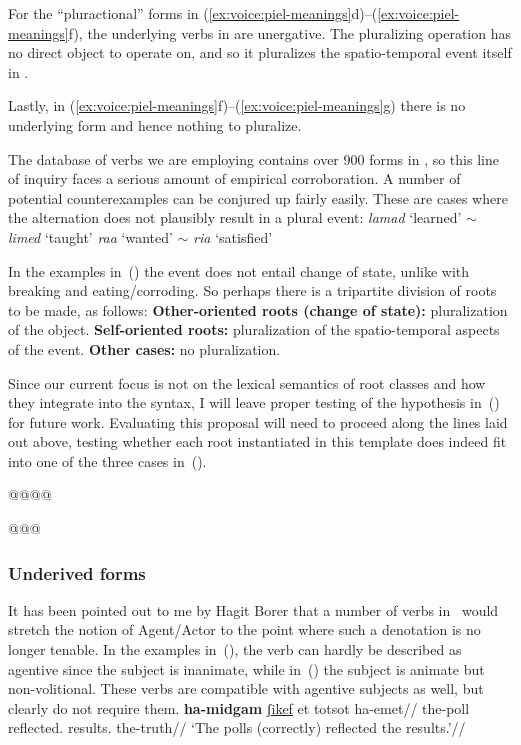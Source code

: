 For the ``pluractional'' forms in (\ref{ex:voice:piel-meanings}d)--(\ref{ex:voice:piel-meanings}f), the underlying verbs in {\tkal} are unergative. The pluralizing operation has no direct object to operate on, and so it pluralizes the spatio-temporal event itself in {\tpie}.

Lastly, in (\ref{ex:voice:piel-meanings}f)--(\ref{ex:voice:piel-meanings}g) there is no underlying form and hence nothing to pluralize.

The database of verbs we are employing contains over 900 forms in {\tpie}, so this line of inquiry faces a serious amount of empirical corroboration. A number of potential counterexamples can be conjured up fairly easily. These are cases where the alternation does not plausibly result in a plural event:
\pex
	\a \emph{lamad} `learned' $\sim$ \emph{limed} `taught'
	\a \emph{ra{\texttslig}a} `wanted' $\sim$ \emph{ri{\texttslig}a} `satisfied'
\xe

In the examples in~(\lastx) the event does not entail change of state, unlike with breaking and eating/corroding. So perhaps there is a tripartite division of roots to be made, as follows:
\pex
	\a \textbf{Other-oriented roots (change of state):} pluralization of the object.
	\a \textbf{Self-oriented roots:} pluralization of the spatio-temporal aspects of the event.
	\a \textbf{Other cases:} no pluralization.
\xe

Since our current focus is not on the lexical semantics of root classes and how they integrate into the syntax, I will leave proper testing of the hypothesis in~(\lastx) for future work. Evaluating this proposal will need to proceed along the lines laid out above, testing whether each root instantiated in this template does indeed fit into one of the three cases in~(\lastx).

@@\cite{greenberg10}@@


@@@
		\subsubsection{Underived forms} \label{voice:va:heb:underived}

It has been pointed out to me by Hagit Borer that a number of verbs in \tpie~would stretch the notion of Agent/Actor to the point where such a denotation is no longer tenable. In the examples in~(\nextx), the verb can hardly be described as agentive since the subject is inanimate, while in~(\anextx) the subject is animate but non-volitional. These verbs are compatible with agentive subjects as well, but clearly do not require them.
\pex
  \a \begingl
    \gla \textbf{ha-midgam} \underline{ʃikef} et totsot ha-emet//
    \glb the-poll reflected.  results. the-truth//
    \glft `The polls (correctly) reflected the results.'//
  \endgl
    
